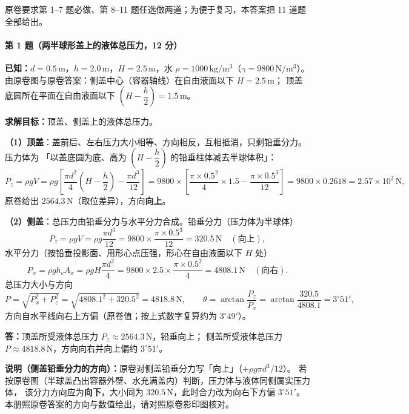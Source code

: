 
\noindent 原卷要求第 1--7 题必做、第 8--11 题任选做两道；为便于复习，本答案把 11 道题全部给出。

\paragraph{第 1 题（两半球形盖上的液体总压力，12 分）}
\begin{jie}
\textbf{已知：}$d=0.5\,\mathrm{m}$，$h=2.0\,\mathrm{m}$，$H=2.5\,\mathrm{m}$，水 $\rho=1000\,\mathrm{kg/m^3}$（$\gamma=9800\,\mathrm{N/m^3}$）。
由原卷图与原卷答案：侧盖中心（容器轴线）在自由液面以下 $H=2.5\,\mathrm{m}$；
顶盖底圆所在平面在自由液面以下 $\left(H-\dfrac h2\right)=1.5\,\mathrm{m}$。

\textbf{求解目标：}顶盖、侧盖上的液体总压力。

\textbf{（1）顶盖}：盖前后、左右压力大小相等、方向相反，互相抵消，只剩铅垂分力。压力体为
「以盖底圆为底、高为 $\left(H-\dfrac h2\right)$ 的铅垂柱体减去半球体积」：
\[
P_z=\rho gV=\rho g\left[\frac{\pi d^{2}}{4}\left(H-\frac h2\right)-\frac{\pi d^{3}}{12}\right]
=9800\times\left[\frac{\pi\times0.5^{2}}{4}\times1.5-\frac{\pi\times0.5^{3}}{12}\right]
=9800\times0.2618=2.57\times10^{3}\,\mathrm{N},
\]
原卷给出 $2564.3\,\mathrm{N}$（取位差异），方向\textbf{向上}。

\textbf{（2）侧盖}：总压力由铅垂分力与水平分力合成。铅垂分力（压力体为半球体）
\[
P_z=\rho gV=\rho g\frac{\pi d^{3}}{12}=9800\times\frac{\pi\times0.5^{3}}{12}=320.5\,\mathrm{N}\quad(\text{向上}),
\]
水平分力（按铅垂投影面、用形心点压强，形心在自由液面以下 $H$ 处）
\[
P_x=\rho gh_cA_x=\rho gH\frac{\pi d^{2}}{4}
=9800\times2.5\times\frac{\pi\times0.5^{2}}{4}=4808.1\,\mathrm{N}\quad(\text{向右}).
\]
总压力大小与方向
\[
P=\sqrt{P_x^{2}+P_z^{2}}=\sqrt{4808.1^{2}+320.5^{2}}=4818.8\,\mathrm{N},
\qquad
\theta=\arctan\frac{P_z}{P_x}=\arctan\frac{320.5}{4808.1}=3^{\circ}51',
\]
方向自水平线向右上方偏（原卷值；按上式数字复算约为 $3^{\circ}49'$）。

\textbf{答：}顶盖所受液体总压力 $P_z\approx2564.3\,\mathrm{N}$，铅垂向上；
侧盖所受液体总压力 $P\approx4818.8\,\mathrm{N}$，方向向右并向上偏约 $3^{\circ}51'$。
\end{jie}

\begin{tishi}
\textbf{说明（侧盖铅垂分力的方向）：}原卷对侧盖铅垂分力写「向上」（$+\rho g\pi d^{3}/12$）。
若按原卷图（半球盖凸出容器外壁、水充满盖内）判断，压力体与液体同侧属实压力体，
该分力方向应为\textbf{向下}，大小同为 $320.5\,\mathrm{N}$，此时合力改为向右下方偏 $3^{\circ}51'$。
本册照原卷答案的方向与数值给出，请对照原卷影印图核对。
\end{tishi}


